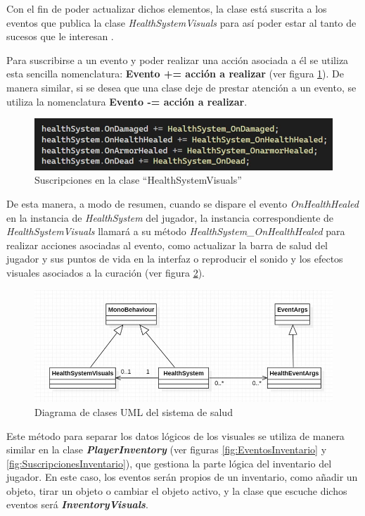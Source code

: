 Con el fin de poder actualizar dichos elementos, la clase está suscrita a los eventos que publica la clase \textit{HealthSystemVisuals} para así poder estar al tanto de sucesos que le interesan .

Para suscribirse a un evento y poder realizar una acción asociada a él se utiliza esta sencilla nomenclatura: \textbf{Evento += acción a realizar} (ver figura \ref{fig:SuscripcionesHealth}). De manera similar, si se desea que una clase deje de prestar atención a un evento, se utiliza la nomenclatura \textbf{Evento -= acción a realizar}.

\begin{figure}[h]
	\centering
	\includegraphics[scale=0.45]{img/HealthSystemVisuals.jpg}
	\caption{Suscripciones en la clase ``HealthSystemVisuals''}
	\label{fig:SuscripcionesHealth}
    \end{figure}
    
De esta manera, a modo de resumen, cuando se dispare el evento \textit{OnHealthHealed} en la instancia de \textit{HealthSystem} del jugador, la instancia correspondiente de \textit{HealthSystemVisuals} llamará a su método \textit{HealthSystem\_OnHealthHealed} para realizar acciones asociadas al evento, como actualizar la barra de salud del jugador y sus puntos de vida en la interfaz o reproducir el sonido y los efectos visuales asociados a la curación (ver figura \ref{fig:UMLHealth}).

\begin{figure}[h]
	\centering
	\includegraphics[scale=0.45]{img/UMLClassDiagram.jpg}
	\caption{Diagrama de clases UML del sistema de salud}
	\label{fig:UMLHealth}
    \end{figure}
    
Este método para separar los datos lógicos de los visuales se utiliza de manera similar en la clase \textbf{\textit{PlayerInventory}} (ver figuras \ref{fig:EventosInventario} y \ref{fig:SuscripcionesInventario}), que gestiona la parte lógica del inventario del jugador. En este caso, los eventos serán propios de un inventario, como añadir un objeto, tirar un objeto o cambiar el objeto activo, y la clase que escuche dichos eventos será \textbf{\textit{InventoryVisuals}}.

